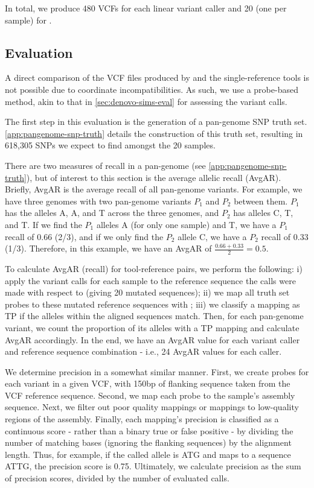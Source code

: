 \noindent
In total, we produce 480 VCFs for each linear variant caller and 20 (one per sample) for \pandora{}.

\subsection{Evaluation}
\label{sec:denovo-empirical-eval}

A direct comparison of the VCF files produced by \pandora{} and the single-reference tools is not possible due to coordinate incompatibilities. As such, we use a probe-based method, akin to that in \autoref{sec:denovo-sims-eval} for assessing the variant calls. 

The first step in this evaluation is the generation of a pan-genome SNP truth set. \autoref{app:pangenome-snp-truth} details the construction of this truth set, resulting in 618,305 SNPs we expect to find amongst the 20 samples.

There are two measures of recall in a pan-genome (see \autoref{app:pangenome-snp-truth}), but of interest to this section is the average allelic recall (AvgAR). Briefly, AvgAR is the average recall of all pan-genome variants. For example, we have three genomes with two pan-genome variants $P_1$ and $P_2$ between them. $P_1$ has the alleles A, A, and T across the three genomes, and $P_2$ has alleles C, T, and T. If we find the $P_1$ alleles A (for only one sample) and T, we have a $P_1$ recall of 0.66 (2/3), and if we only find the $P_2$ allele C, we have a $P_2$ recall of 0.33 (1/3). Therefore, in this example, we have an AvgAR of $\frac{0.66+0.33}{2}=0.5$.

To calculate AvgAR (recall) for tool-reference pairs, we perform the following: i) apply the variant calls for each sample to the reference sequence the calls were made with respect to (giving 20 mutated sequences); ii) we map all truth set probes to these mutated reference sequences with ; iii) we classify a mapping as TP if the alleles within the aligned sequences match. Then, for each pan-genome variant, we count the proportion of its alleles with a TP mapping and calculate AvgAR accordingly. In the end, we have an AvgAR value for each variant caller and reference sequence combination - i.e., 24 AvgAR values for each caller.

We determine precision in a somewhat similar manner. First, we create probes for each variant in a given VCF, with 150bp of flanking sequence taken from the VCF reference sequence. Second, we map each probe to the sample's assembly sequence. Next, we filter out poor quality mappings or mappings to low-quality regions of the assembly. Finally, each mapping's precision is classified as a continuous score - rather than a binary true or false positive - by dividing the number of matching bases (ignoring the flanking sequences) by the alignment length. Thus, for example, if the called allele is ATG and maps to a sequence ATTG, the precision score is 0.75. Ultimately, we calculate precision as the sum of precision scores, divided by the number of evaluated calls.

